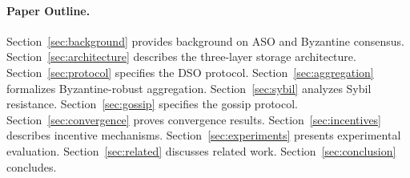 \paragraph{Paper Outline.}
Section~\ref{sec:background} provides background on ASO and Byzantine consensus.
Section~\ref{sec:architecture} describes the three-layer storage architecture.
Section~\ref{sec:protocol} specifies the DSO protocol.
Section~\ref{sec:aggregation} formalizes Byzantine-robust aggregation.
Section~\ref{sec:sybil} analyzes Sybil resistance.
Section~\ref{sec:gossip} specifies the gossip protocol.
Section~\ref{sec:convergence} proves convergence results.
Section~\ref{sec:incentives} describes incentive mechanisms.
Section~\ref{sec:experiments} presents experimental evaluation.
Section~\ref{sec:related} discusses related work.
Section~\ref{sec:conclusion} concludes.


